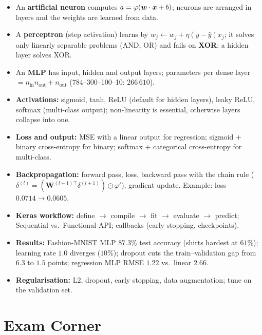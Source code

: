 \begin{summary}
\begin{itemize}
  \item An \textbf{artificial neuron} computes $a=\varphi(\boldsymbol{w}\cdot\boldsymbol{x}+b)$; neurons are arranged in layers and the weights are learned from data.
  \item A \textbf{perceptron} (step activation) learns by $w_j\leftarrow w_j+\eta(y-\hat y)x_j$; it solves only linearly separable problems (AND, OR) and fails on \textbf{XOR}; a hidden layer solves XOR.
  \item An \textbf{MLP} has input, hidden and output layers; parameters per dense layer $=n_{\text{in}}n_{\text{out}}+n_{\text{out}}$ (784--300--100--10: $266\,610$).
  \item \textbf{Activations:} sigmoid, tanh, ReLU (default for hidden layers), leaky ReLU, softmax (multi-class output); non-linearity is essential, otherwise layers collapse into one.
  \item \textbf{Loss and output:} MSE with a linear output for regression; sigmoid + binary cross-entropy for binary; softmax + categorical cross-entropy for multi-class.
  \item \textbf{Backpropagation:} forward pass, loss, backward pass with the chain rule ($\delta^{(l)}=(\mathbf W^{(l+1)\top}\delta^{(l+1)})\odot\varphi'$), gradient update. Example: loss $0.0714\to0.0605$.
  \item \textbf{Keras workflow:} define $\to$ compile $\to$ fit $\to$ evaluate $\to$ predict; Sequential vs.\ Functional API; callbacks (early stopping, checkpoints).
  \item \textbf{Results:} Fashion-MNIST MLP $87.3\%$ test accuracy (shirts hardest at $61\%$); learning rate $1.0$ diverges ($10\%$); dropout cuts the train--validation gap from $6.3$ to $1.5$ points; regression MLP RMSE $1.22$ vs.\ linear $2.66$.
  \item \textbf{Regularisation:} L2, dropout, early stopping, data augmentation; tune on the validation set.
\end{itemize}
\end{summary}

\section*{Exam Corner}

